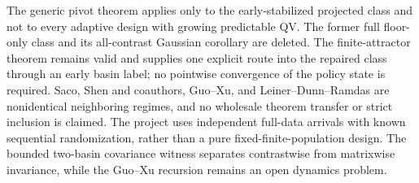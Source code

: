 The generic pivot theorem applies only to the early-stabilized projected class and not to every adaptive design with growing predictable QV. The former full floor-only class and its all-contrast Gaussian corollary are deleted. The finite-attractor theorem remains valid and supplies one explicit route into the repaired class through an early basin label; no pointwise convergence of the policy state is required. Saco, Shen and coauthors, Guo--Xu, and Leiner--Dunn--Ramdas are nonidentical neighboring regimes, and no wholesale theorem transfer or strict inclusion is claimed. The project uses independent full-data arrivals with known sequential randomization, rather than a pure fixed-finite-population design. The bounded two-basin covariance witness separates contrastwise from matrixwise invariance, while the Guo--Xu recursion remains an open dynamics problem.